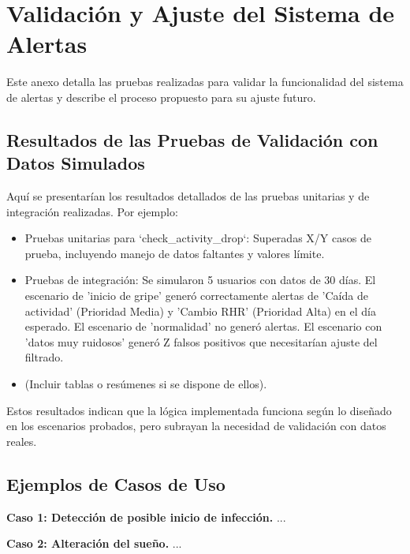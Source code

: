 
\chapter{Validación y Ajuste del Sistema de Alertas}
\label{anexo:validacion_alertas}

Este anexo detalla las pruebas realizadas para validar la funcionalidad del sistema de alertas y describe el proceso propuesto para su ajuste futuro.

\section{Resultados de las Pruebas de Validación con Datos Simulados}
Aquí se presentarían los resultados detallados de las pruebas unitarias y de integración realizadas. Por ejemplo:
\begin{itemize}
    \item Pruebas unitarias para `check\_activity\_drop`: Superadas X/Y casos de prueba, incluyendo manejo de datos faltantes y valores límite.
    \item Pruebas de integración: Se simularon 5 usuarios con datos de 30 días. El escenario de 'inicio de gripe' generó correctamente alertas de 'Caída de actividad' (Prioridad Media) y 'Cambio RHR' (Prioridad Alta) en el día esperado. El escenario de 'normalidad' no generó alertas. El escenario con 'datos muy ruidosos' generó Z falsos positivos que necesitarían ajuste del filtrado.
    \item (Incluir tablas o resúmenes si se dispone de ellos).
\end{itemize}
Estos resultados indican que la lógica implementada funciona según lo diseñado en los escenarios probados, pero subrayan la necesidad de validación con datos reales.

\section{Ejemplos de Casos de Uso}
\textbf{Caso 1: Detección de posible inicio de infección.} ...

\textbf{Caso 2: Alteración del sueño.} ...

